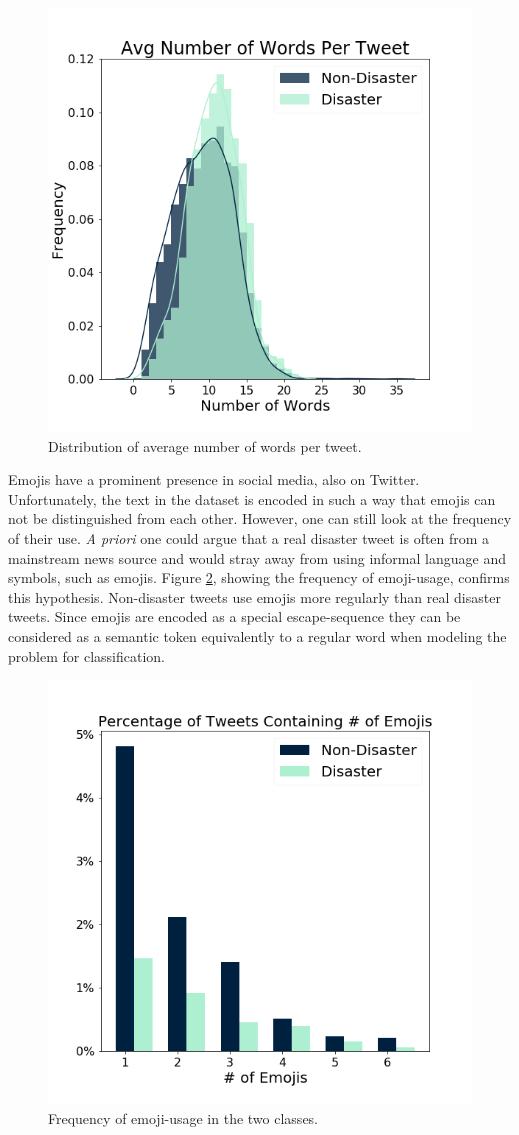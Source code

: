\documentclass[journal, ]{IEEEtran}
\let\MYoriglatexcaption\caption
\renewcommand{\caption}[2][\relax]{\MYoriglatexcaption[#2]{#2}}
\begin{document}
\begin{figure}[hbt!]
  \centering
  \includegraphics[width=0.7\linewidth]{../figures/num_words.png}
  \caption{Distribution of average number of words per tweet.}
  \label{fig:num_words}
\end{figure}

Emojis have a prominent presence in social media, also on Twitter.
Unfortunately, the text in the dataset is encoded in such a way that emojis can
not be distinguished from each other. However, one can still look at the
frequency of their use. \textit{A priori} one could argue that a real disaster tweet
is often from a mainstream news source and would stray away from using informal
language and symbols, such as emojis. Figure \ref{fig:emoji_freq}, showing the
frequency of emoji-usage, confirms this hypothesis. Non-disaster tweets use
emojis more regularly than real disaster tweets. Since emojis are encoded as a
special escape-sequence they can be considered as a semantic token equivalently
to a regular word when modeling the problem for classification.

\begin{figure}[hbt!]
  \centering
  \includegraphics[width=0.7\linewidth]{../figures/emoji_freq.png}
  \caption{Frequency of emoji-usage in the two classes.}
  \label{fig:emoji_freq}
\end{figure}
\end{document}
